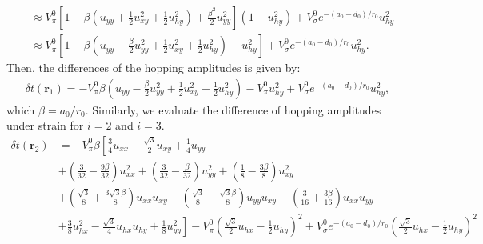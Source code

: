 \documentclass[aps,prx,10pt,twocolumn,superscriptaddress]{revtex4}
\begin{document}
\begin{widetext}
\begin{align}
& \approx V^{0}_{\pi}\left[1-\beta\left(u_{yy}+\frac{1}{2}u^{2}_{xy}+\frac{1}{2}u^{2}_{hy}\right)+\frac{\beta^{2}}{2}u_{yy}^{2}\right]\left(1-u^{2}_{hy}\right)+V^{0}_{\sigma}e^{-(a_{0}-d_{0})/r_{0}}u^{2}_{hy}\nonumber\\
&\approx V^{0}_{\pi}\left[1-\beta\left(u_{yy}-\frac{\beta}{2}u^{2}_{yy}+\frac{1}{2}u^{2}_{xy}+\frac{1}{2}u^{2}_{hy}\right)-u^{2}_{hy}\right]+V^{0}_{\sigma}e^{-(a_{0}-d_{0})/r_{0}}u^{2}_{hy}.
\end{align}
Then, the differences of the hopping amplitudes is given by:
\begin{align}
\delta t(\textbf{r}_{1})=-V^{0}_{\pi}\beta\left(u_{yy}-\frac{\beta}{2}u^{2}_{yy}+\frac{1}{2}u^{2}_{xy}+\frac{1}{2}u^{2}_{hy}\right)-V^{0}_{\pi}u^{2}_{hy}+V^{0}_{\sigma}e^{-(a_{0}-d_{0})/r_{0}}u^{2}_{hy},
\end{align}
which $\beta\!=\!a_{0}/r_{0}$. Similarly, we evaluate the difference of hopping amplitudes under strain for $i=2$ and $i=3$.
\allowdisplaybreaks
\begin{align}
\delta t(\textbf{r}_{2})&=-V^{0}_{\pi}\beta\left[\frac{3}{4}u_{xx}-\frac{\sqrt{3}}{2}u_{xy}+\frac{1}{4}u_{yy}\right.\nonumber\\
&+\left(\frac{3}{32}-\frac{9\beta}{32}\right)u^{2}_{xx}+\left(\frac{3}{32}-\frac{\beta}{32}\right)u^{2}_{yy}+\left(\frac{1}{8}-\frac{3\beta}{8}\right)u^{2}_{xy}\nonumber\\
&+\left(\frac{\sqrt{3}}{8}+\frac{3\sqrt{3}\beta}{8}\right)u_{xx}u_{xy}-\left(\frac{\sqrt{3}}{8}-\frac{\sqrt{3}\beta}{8}\right)u_{yy}u_{xy}-\left(\frac{3}{16}+\frac{3\beta}{16}\right)u_{xx}u_{yy}\nonumber\\
&+\left.\frac{3}{8}u^{2}_{hx}-\frac{\sqrt{3}}{4}u_{hx}u_{hy}+\frac{1}{8}u^{2}_{yy}\right]-V^{0}_{\pi}\left(\frac{\sqrt{3}}{2}u_{hx}-\frac{1}{2}u_{hy}\right)^{2}+V^{0}_{\sigma}e^{-(a_{0}-d_{0})/r_{0}}\left(\frac{\sqrt{3}}{2}u_{hx}-\frac{1}{2}u_{hy}\right)^{2}\nonumber\\

\end{align}
\end{widetext}
\end{document}
